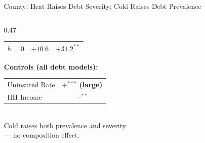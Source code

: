 \documentclass[aspectratio=169,11pt]{beamer}
\newcommand{\emphcolor}[1]{{\color{WarmOrange}\textbf{#1}}}
\newcommand{\graytext}[1]{{\color{WarmGray}#1}}
\begin{document}
\begin{frame}{County: Heat Raises Debt Severity; Cold Raises Debt Prevalence}
\begin{columns}[T]
\begin{column}{0.47\textwidth}
\begin{tabular}{lcc}
        $h{=}0$  & $+10.6$        & \emphcolor{$+31.2^{**}$}  \\
        \bottomrule
      \end{tabular}
      \vspace{0.35em}
      \textbf{Controls (all debt models):}\\[0.2em]
      \begin{tabular}{lc}
        Uninsured Rate & \emphcolor{$+^{***}$ (large)} \\
        HH Income      & \emphcolor{$-^{**}$} \\
      \end{tabular}
      \vspace{0.2em}\\
      \graytext{\scriptsize Cold raises both prevalence and severity\\--- no composition effect.}
    \end{column}
  \end{columns}
\end{frame}
\end{document}

